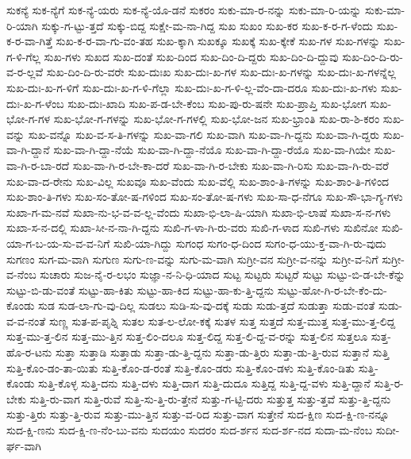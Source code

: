 {ಸುಕನ್ಯೆ
ಸುಕ-ನ್ಯೆಗೆ
ಸುಕ-ನ್ಯೆ-ಯರು
ಸುಕ-ನ್ಯೆ-ಯೊ-ಡನೆ
ಸುಕರಂ
ಸುಕು-ಮಾ-ರ-ನನ್ನು
ಸುಕು-ಮಾ-ರಿ-ಯನ್ನು
ಸುಕು-ಮಾ-ರಿ-ಯಾಗಿ
ಸುಕ್ಕು-ಗ-ಟ್ಟು-ತ್ತದೆ
ಸುಕ್ಕು-ಬಿದ್ದ
ಸುಕ್ಷೇ-ಮ-ನಾ-ಗಿದ್ದ
ಸುಖ
ಸುಖಂ
ಸುಖ-ಕರ
ಸುಖ-ಕ-ರ-ಗ-ಳೆಂದು
ಸುಖ-ಕ-ರ-ವಾ-ಗಿತ್ತೆ
ಸುಖ-ಕ-ರ-ವಾ-ಗು-ವಂ-ತಹ
ಸುಖ-ಕ್ಕಾಗಿ
ಸುಖಕ್ಕೂ
ಸುಖಕ್ಕೆ
ಸುಖ-ಕ್ಕೇಕೆ
ಸುಖ-ಗಳ
ಸುಖ-ಗಳನ್ನು
ಸುಖ-ಗ-ಳಿ-ಗೆಲ್ಲ
ಸುಖ-ಗಳು
ಸುಖದ
ಸುಖ-ದಂತೆ
ಸುಖ-ದಿಂದ
ಸುಖ-ದಿಂ-ದಿ-ದ್ದರು
ಸುಖ-ದಿಂ-ದಿ-ದ್ದುವು
ಸುಖ-ದಿಂ-ದಿ-ರು-ವ-ರ-ಲ್ಲವೆ
ಸುಖ-ದಿಂ-ದಿ-ರು-ವರೇ
ಸುಖ-ದುಃಖ
ಸುಖ-ದುಃ-ಖ-ಗಳ
ಸುಖ-ದುಃ-ಖ-ಗಳನ್ನು
ಸುಖ-ದುಃ-ಖ-ಗಳನ್ನೆಲ್ಲ
ಸುಖ-ದುಃ-ಖ-ಗ-ಳಿಗೆ
ಸುಖ-ದುಃ-ಖ-ಗ-ಳಿ-ಗೆಲ್ಲಾ
ಸುಖ-ದುಃ-ಖ-ಗ-ಳಿ-ಲ್ಲ-ವೆಂ-ದಾ-ದರೂ
ಸುಖ-ದುಃ-ಖ-ಗಳು
ಸುಖ-ದುಃ-ಖ-ಗ-ಳೆಂಬ
ಸುಖ-ದುಃ-ಖಾದಿ
ಸುಖ-ಪ-ಡ-ಬೇ-ಕೆಂಬ
ಸುಖ-ಪು-ರು-ಷನೇ
ಸುಖ-ಪ್ರಾಪ್ತಿ
ಸುಖ-ಭೋಗ
ಸುಖ-ಭೋ-ಗ-ಗಳ
ಸುಖ-ಭೋ-ಗ-ಗಳನ್ನು
ಸುಖ-ಭೋ-ಗ-ಗಳಲ್ಲಿ
ಸುಖ-ಭೋ-ಜನ
ಸುಖ-ಭ್ರಾಂತಿ
ಸುಖ-ರಾ-ಶಿ-ಕರಂ
ಸುಖ-ವನ್ನು
ಸುಖ-ವನ್ನೊ
ಸುಖ-ವ-ಸ-ತಿ-ಗಳನ್ನು
ಸುಖ-ವಾ-ಗಲಿ
ಸುಖ-ವಾಗಿ
ಸುಖ-ವಾ-ಗಿ-ದ್ದನು
ಸುಖ-ವಾ-ಗಿ-ದ್ದರು
ಸುಖ-ವಾ-ಗಿ-ದ್ದಾನೆ
ಸುಖ-ವಾ-ಗಿ-ದ್ದಾ-ನೆಯೆ
ಸುಖ-ವಾ-ಗಿ-ದ್ದಾ-ನೆಯೊ
ಸುಖ-ವಾ-ಗಿ-ದ್ದಾ-ರೆಯೊ
ಸುಖ-ವಾ-ಗಿಯೇ
ಸುಖ-ವಾ-ಗಿ-ರ-ಬಾ-ರದೆ
ಸುಖ-ವಾ-ಗಿ-ರ-ಬೇ-ಕಾ-ದರೆ
ಸುಖ-ವಾ-ಗಿ-ರ-ಬೇಕು
ಸುಖ-ವಾ-ಗಿ-ರಿಸು
ಸುಖ-ವಾ-ಗಿ-ರು-ವರೆ
ಸುಖ-ವಾ-ದ-ರೇನು
ಸುಖ-ವಿಲ್ಲ
ಸುಖವೂ
ಸುಖ-ವೆಂದು
ಸುಖ-ವೆಲ್ಲಿ
ಸುಖ-ಶಾಂ-ತಿ-ಗಳನ್ನು
ಸುಖ-ಶಾಂ-ತಿ-ಗಳಿಂದ
ಸುಖ-ಶಾಂ-ತಿ-ಗಳು
ಸುಖ-ಸಂ-ತೋ-ಷ-ಗಳಿಂದ
ಸುಖ-ಸಂ-ತೋ-ಷ-ಗಳು
ಸುಖ-ಸಾ-ಧ-ನೆಗೂ
ಸುಖ-ಸೌ-ಭಾ-ಗ್ಯ-ಗಳು
ಸುಖಾ-ಗ-ಮ-ನವೆ
ಸುಖಾ-ನು-ಭ-ವ-ವ-ಲ್ಲ-ವೆಂದು
ಸುಖಾ-ಭಿ-ಲಾ-ಷಿ-ಯಾಗಿ
ಸುಖಾ-ಭಿ-ಲಾಷೆ
ಸುಖಾ-ಸ-ನ-ಗಳು
ಸುಖಾ-ಸ-ನ-ದಲ್ಲಿ
ಸುಖಾ-ಸೀ-ನ-ನಾ-ಗಿ-ದ್ದನು
ಸುಖಿ-ಗ-ಳಾ-ಗಿ-ರು-ವರು
ಸುಖಿ-ಗ-ಳಾದ
ಸುಖಿ-ಗಳು
ಸುಖಿನೋ
ಸುಖಿ-ಯಾ-ಗ-ಬ-ಯ-ಸು-ವ-ವ-ನಿಗೆ
ಸುಖಿ-ಯಾ-ಗಿದ್ದು
ಸುಗಂಧ
ಸುಗಂ-ಧ-ದಿಂದ
ಸುಗಂ-ಧ-ಯು-ಕ್ತ-ವಾ-ಗಿ-ರು-ವುದು
ಸುಗಣಂ
ಸುಗ-ಮ-ವಾಗಿ
ಸುಗುಣ
ಸುಗು-ಣ-ವನ್ನು
ಸುಗು-ಮ-ವಾಗಿ
ಸುಗ್ರೀ-ವನ
ಸುಗ್ರೀ-ವ-ನನ್ನು
ಸುಗ್ರೀ-ವ-ನಿಗೆ
ಸುಗ್ರೀ-ವ-ನೆಂಬ
ಸುಚಾರು
ಸುಜ-ನೈ-ರ-ಲಭಂ
ಸುಜ್ಞಾ-ನ-ನಿ-ಧಿ-ಯಾದ
ಸುಟ್ಟ
ಸುಟ್ಟರು
ಸುಟ್ಟರೆ
ಸುಟ್ಟು
ಸುಟ್ಟು-ಬಿ-ಡ-ಬೇ-ಕೆನ್ನು
ಸುಟ್ಟು-ಬಿ-ಡು-ವಂತೆ
ಸುಟ್ಟು-ಹಾ-ಕಿತು
ಸುಟ್ಟು-ಹಾ-ಕಿದ
ಸುಟ್ಟು-ಹಾ-ಕು-ತ್ತಿ-ದ್ದನು
ಸುಟ್ಟು-ಹೋ-ಗಿ-ರ-ಬೇ-ಕೆಂ-ದು-ಕೊಂಡು
ಸುಡ
ಸುಡ-ಲಾ-ಗು-ವು-ದಿಲ್ಲ
ಸುಡಲು
ಸುಡಿ-ಸು-ವು-ದಕ್ಕೆ
ಸುಡು
ಸುಡು-ತ್ತದೆ
ಸುಡುತ್ತಾ
ಸುಡು-ವಂತೆ
ಸುಡು-ವ-ವ-ನಂತೆ
ಸುಣ್ಣ
ಸುತ-ಪ-ಪೃಶ್ನಿ
ಸುತಲ
ಸುತ-ಲ-ಲೋ-ಕಕ್ಕೆ
ಸುತಳ
ಸುತ್ತ
ಸುತ್ತದೆ
ಸುತ್ತ-ಮುತ್ತ
ಸುತ್ತ-ಮು-ತ್ತ-ಲಿದ್ದ
ಸುತ್ತ-ಮು-ತ್ತ-ಲಿನ
ಸುತ್ತ-ಮು-ತ್ತಿನ
ಸುತ್ತ-ಲಿಂ-ದಲೂ
ಸುತ್ತ-ಲಿದ್ದ
ಸುತ್ತ-ಲಿ-ದ್ದ-ವ-ರನ್ನು
ಸುತ್ತ-ಲಿನ
ಸುತ್ತಲೂ
ಸುತ್ತ-ಹೊ-ರ-ಟನು
ಸುತ್ತಾ
ಸುತ್ತಾಡಿ
ಸುತ್ತಾಡು
ಸುತ್ತಾ-ಡು-ತ್ತಿ-ದ್ದನು
ಸುತ್ತಾ-ಡು-ತ್ತಿರು
ಸುತ್ತಾ-ಡು-ತ್ತಿ-ರುವ
ಸುತ್ತಾನೆ
ಸುತ್ತಿ
ಸುತ್ತಿ-ಕೊಂ-ಡಂ-ತಾ-ಯಿತು
ಸುತ್ತಿ-ಕೊಂ-ಡ-ರಂತೆ
ಸುತ್ತಿ-ಕೊಂ-ಡರು
ಸುತ್ತಿ-ಕೊಂ-ಡಳು
ಸುತ್ತಿ-ಕೊಂ-ಡಿತು
ಸುತ್ತಿ-ಕೊಂಡು
ಸುತ್ತಿ-ಕೊಳ್ಳ
ಸುತ್ತಿ-ದನು
ಸುತ್ತಿ-ದಳು
ಸುತ್ತಿ-ದಾಗ
ಸುತ್ತಿ-ದುದೂ
ಸುತ್ತಿದ್ದ
ಸುತ್ತಿ-ದ್ದ-ವಳು
ಸುತ್ತಿ-ದ್ದಾನೆ
ಸುತ್ತಿ-ರ-ಬೇಕು
ಸುತ್ತಿ-ರು-ವಾಗ
ಸುತ್ತಿ-ರುವೆ
ಸುತ್ತಿ-ಸು-ತ್ತಿ-ರು-ತ್ತೇನೆ
ಸುತ್ತು-ಗ-ಟ್ಟಿ-ದರು
ಸುತ್ತುತ್ತ
ಸುತ್ತು-ತ್ತವೆ
ಸುತ್ತು-ತ್ತಿ-ದ್ದನು
ಸುತ್ತು-ತ್ತಿರು
ಸುತ್ತು-ತ್ತಿ-ರುವ
ಸುತ್ತು-ಮು-ತ್ತಿನ
ಸುತ್ತು-ವ-ರಿದ
ಸುತ್ತು-ವಾಗ
ಸುತ್ತೇನೆ
ಸುದ-ಕ್ಷಿಣ
ಸುದ-ಕ್ಷಿ-ಣ-ನನ್ನೂ
ಸುದ-ಕ್ಷಿ-ಣನು
ಸುದ-ಕ್ಷಿ-ಣ-ನೆಂ-ಬು-ವನು
ಸುದಯಂ
ಸುದರಂ
ಸುದ-ರ್ಶನ
ಸುದ-ರ್ಶ-ನದ
ಸುದಾ-ಮ-ನೆಂಬ
ಸುದೀ-ರ್ಘ-ವಾಗಿ
}
